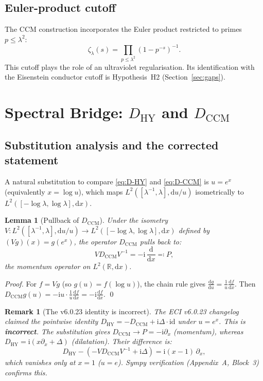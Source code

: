 \documentclass[11pt]{article}
\newtheorem{lemma}[theorem]{Lemma}
\newtheorem{remark}[theorem]{Remark}
\newcommand{\HY}{\mathrm{HY}}
\newcommand{\CCM}{\mathrm{CCM}}
\newcommand{\dd}{\mathrm{d}}
\newcommand{\ii}{\mathrm{i}}
\newcommand{\Lam}{\lambda}
\newcommand{\Del}{\Delta}
\begin{document}
\subsection{Euler-product cutoff}

The CCM construction incorporates the Euler product restricted to
primes $p \le \Lam^2$:
\begin{equation}
  \zeta_\Lam(s) = \prod_{p \le \Lam^2} (1 - p^{-s})^{-1}.
  \label{eq:euler-cutoff}
\end{equation}
This cutoff plays the role of an ultraviolet regularisation. Its
identification with the Eisenstein conductor cutoff is Hypothesis~H2
(Section~\ref{sec:gaps}).

\section{Spectral Bridge: $D_\HY$ and $D_\CCM$}
\label{sec:bridge}

\subsection{Substitution analysis and the corrected statement}

A natural substitution to compare \eqref{eq:D-HY} and \eqref{eq:D-CCM}
is $u = e^x$ (equivalently $x = \log u$), which maps
$L^2([\Lam^{-1},\Lam],\dd u/u)$ isometrically to
$L^2([-\log\Lam, \log\Lam], \dd x)$.

\begin{lemma}[Pullback of $D_\CCM$]
\label{lem:pullback}
Under the isometry $V: L^2([\Lam^{-1},\Lam],\dd u/u) \to
L^2([-\log\Lam,\log\Lam],\dd x)$ defined by $(Vg)(x) = g(e^x)$,
the operator $D_\CCM$ pulls back to:
\begin{equation}
  V D_\CCM V^{-1} = -\ii\,\frac{\dd}{\dd x} \eqqcolon P,
  \label{eq:pullback}
\end{equation}
the momentum operator on $L^2(\mathbb{R},\dd x)$.
\end{lemma}

\begin{proof}
For $f = Vg$ (so $g(u) = f(\log u)$), the chain rule gives
$\frac{\dd g}{\dd u} = \frac{1}{u}\frac{\dd f}{\dd x}$.
Then $D_\CCM g(u) = -\ii u \cdot \frac{1}{u}\frac{\dd f}{\dd x} =
-\ii \frac{\dd f}{\dd x}$. \qed
\end{proof}

\begin{remark}[The v6.0.23 identity is incorrect]
\label{rem:v6023-wrong}
The ECI v6.0.23 changelog claimed the pointwise identity
$D_\HY = -D_\CCM + \ii\Del\cdot\mathrm{id}$ under $u = e^x$.
This is \textbf{incorrect}. The substitution gives $D_\CCM \to P =
-\ii\partial_x$ (momentum), whereas $D_\HY = \ii(x\partial_x + \Del)$
(dilatation). Their difference is:
\begin{equation}
  D_\HY - (-VD_\CCM V^{-1} + \ii\Del)
  = \ii(x-1)\,\partial_x,
\end{equation}
which vanishes only at $x = 1$ ($u = e$). Sympy verification
(Appendix~A, Block~3) confirms this.
\end{remark}
\end{document}
